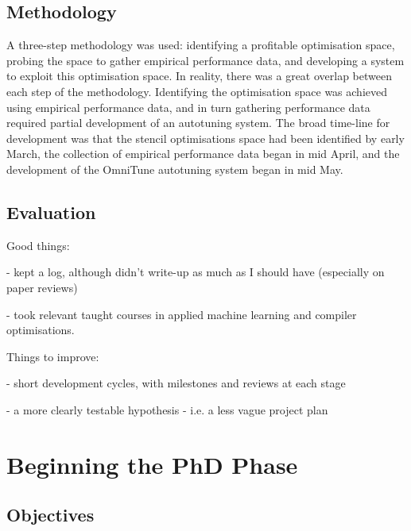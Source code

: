 \documentclass[11pt]{article}
\begin{document}
\subsection{Methodology}

A three-step methodology was used: identifying a profitable
optimisation space, probing the space to gather empirical performance
data, and developing a system to exploit this optimisation space. In
reality, there was a great overlap between each step of the
methodology. Identifying the optimisation space was achieved using
empirical performance data, and in turn gathering performance data
required partial development of an autotuning system. The broad
time-line for development was that the stencil optimisations space had
been identified by early March, the collection of empirical
performance data began in mid April, and the development of the
OmniTune autotuning system began in mid May.


\subsection{Evaluation}

Good things:

- kept a log, although didn't write-up as much as I should have
(especially on paper reviews)

- took relevant taught courses in applied machine learning and
compiler optimisations.


Things to improve:

- short development cycles, with milestones and reviews at each stage

- a more clearly testable hypothesis - i.e. a less vague project plan




\section{Beginning the PhD Phase}




\subsection{Objectives}
\end{document}
